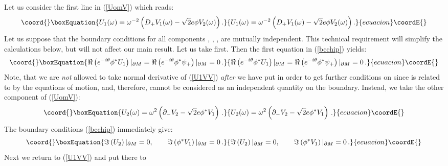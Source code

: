 \documentclass[a4paper,12pt]{article}
\begin{document}
Let us consider the first line in (\ref{UomV}) which reads:
\begin{equation}\coord{}\boxEquation{
U_1(\omega ) =\omega^{-2} \left( D_+ V_1(\omega ) 
                              -\sqrt{2} e \phi V_2(\omega ) \right).
\label{U1VV}
}{
U_1(\omega ) =\omega^{-2} \left( D_+ V_1(\omega ) 
                              -\sqrt{2} e \phi V_2(\omega ) \right).
}{ecuacion}\coordE{}\end{equation}
Let us suppose that the boundary conditions for all components
\coordHE{}, \coordHE{}, \coordHE{}, \coordHE{} are mutually independent. This technical
requirement will simplify the calculations below, but will not affect
our main result. Let us take \coordHE{} first. Then the first equation
in (\ref{bcchip}) yields:
\begin{equation}\coord{}\boxEquation{
\Re \left( e^{-i\theta}\phi^* U_1 \right)|_{\partial M}=
\Re \left( e^{-i\theta}\phi^* \psi_+ \right)|_{\partial M}=
0\,.\label{bcU1D}
}{
\Re \left( e^{-i\theta}\phi^* U_1 \right)|_{\partial M}=
\Re \left( e^{-i\theta}\phi^* \psi_+ \right)|_{\partial M}=
0\,.}{ecuacion}\coordE{}\end{equation}
Note, that we are {\it not} allowed to take normal derivative of
(\ref{U1VV}) {\it after} we have put \coordHE{} in order to get further
conditions on \coordHE{} since \coordHE{} is related to
\coordHE{} by the equations of motion, and, therefore, cannot be
considered as an independent quantity on the boundary.
Instead, we take the other component of (\ref{UomV}):
\begin{equation}\coord{}\boxEquation{
U_2(\omega )=\omega^2 \left( \partial_- V_2 
                            -\sqrt{2} e\phi^* V_1 \right)\,.
\label{U2VV}
}{
U_2(\omega )=\omega^2 \left( \partial_- V_2 
                            -\sqrt{2} e\phi^* V_1 \right)\,.
}{ecuacion}\coordE{}\end{equation}
The boundary conditions (\ref{bcchip}) immediately give:
\begin{equation}\coord{}\boxEquation{
\Im \left( U_2 \right)|_{\partial M}=0,\qquad
\Im \left( \phi^* V_1 \right)|_{\partial M}=0 \,.
\label{bcU2V1}
}{
\Im \left( U_2 \right)|_{\partial M}=0,\qquad
\Im \left( \phi^* V_1 \right)|_{\partial M}=0 \,.
}{ecuacion}\coordE{}\end{equation}
Next we return to (\ref{U1VV}) and put there \coordHE{} to
\end{document}
